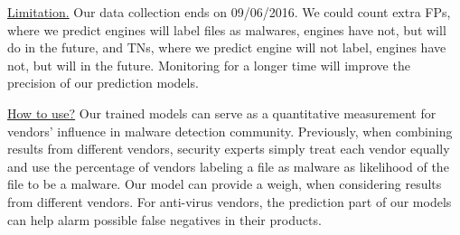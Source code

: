 \underline{Limitation.}
Our data collection ends on 09/06/2016. 
We could count extra FPs, where we predict engines will label files as malwares, engines have not, but will do in the future, 
and TNs, where we predict engine will not label, engines have not, but will in the future. 
Monitoring \vt for a longer time will improve the precision of our prediction models. 

\underline{How to use?}
Our trained models can serve as 
a quantitative measurement for vendors’ influence in malware detection community. 
Previously, when combining results from different vendors, 
security experts simply treat each vendor equally and use the percentage of 
vendors labeling a file as malware as likelihood of the file to be a malware. 
Our model can provide a weigh, when considering results from different vendors.  
For anti-virus vendors, the prediction part of our models can help alarm possible false negatives in their products.
